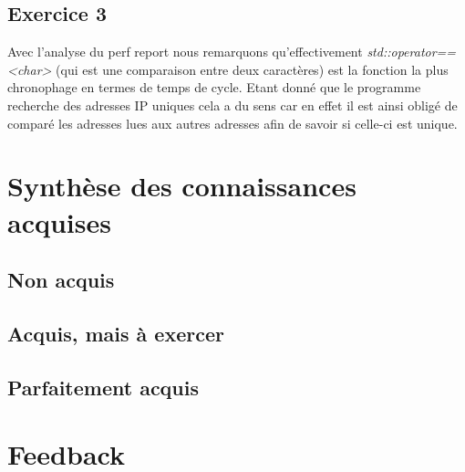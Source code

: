 \documentclass{ReportTemplate}
\begin{document}
\subsection{Exercice 3}
Avec l'analyse du perf report nous remarquons qu'effectivement
\textit{std::operator==<char>} (qui est une comparaison entre deux caractères)
est la fonction la plus chronophage en termes de temps de cycle. Etant donné que
le programme recherche des adresses IP uniques cela a du sens car en effet il
est ainsi obligé de comparé les adresses lues aux autres adresses afin de savoir
si celle-ci est unique. 
\section{Synthèse des connaissances acquises}
\subsection{Non acquis}

\subsection{Acquis, mais à exercer}

\subsection{Parfaitement acquis}

\section{Feedback}
\end{document}
